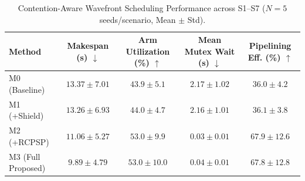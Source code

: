 \begin{table}[t]
\centering
\caption{Contention-Aware Wavefront Scheduling Performance across S1--S7 ($N=5$ seeds/scenario, Mean $\pm$ Std).}
\label{tab:scheduling_makespan}
\begin{tabular}{lcccc}
\toprule
\textbf{Method} & \textbf{Makespan (s)} $\downarrow$ & \textbf{Arm Utilization (\%)} $\uparrow$ & \textbf{Mean Mutex Wait (s)} $\downarrow$ & \textbf{Pipelining Eff. (\%)} $\uparrow$ \\
\midrule
M0 (Baseline) & $13.37 \pm 7.01$ & $43.9 \pm 5.1$ & $2.17 \pm 1.02$ & $36.0 \pm 4.2$ \\
M1 (+Shield) & $13.26 \pm 6.93$ & $44.0 \pm 4.7$ & $2.16 \pm 1.01$ & $36.1 \pm 3.8$ \\
M2 (+RCPSP) & $11.06 \pm 5.27$ & $53.0 \pm 9.9$ & $0.03 \pm 0.01$ & $67.9 \pm 12.6$ \\
M3 (Full Proposed) & $9.89 \pm 4.79$ & $53.0 \pm 10.0$ & $0.04 \pm 0.01$ & $67.8 \pm 12.8$ \\
\bottomrule
\end{tabular}
\end{table}
